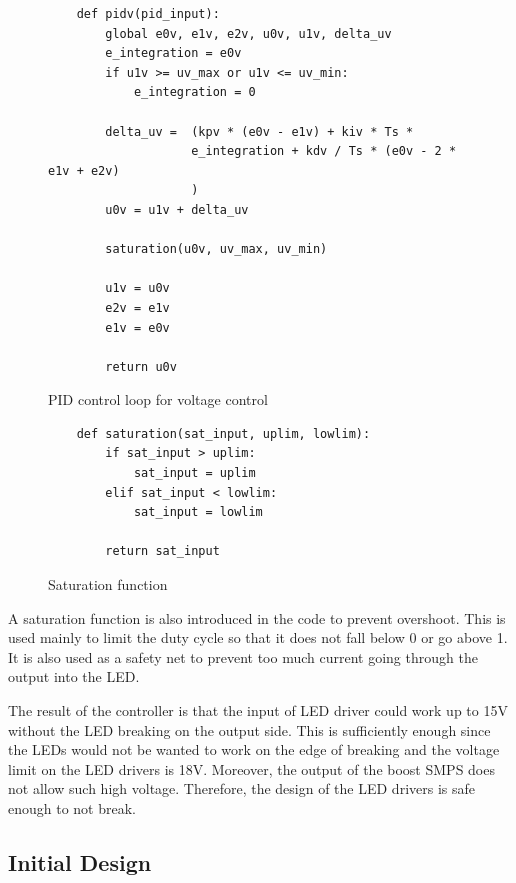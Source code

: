 \begin{figure}
    \footnotesize

    \begin{verbatim}
    def pidv(pid_input):
        global e0v, e1v, e2v, u0v, u1v, delta_uv
        e_integration = e0v
        if u1v >= uv_max or u1v <= uv_min:
            e_integration = 0

        delta_uv =  (kpv * (e0v - e1v) + kiv * Ts * 
                    e_integration + kdv / Ts * (e0v - 2 * e1v + e2v)
                    )  
        u0v = u1v + delta_uv

        saturation(u0v, uv_max, uv_min)

        u1v = u0v
        e2v = e1v
        e1v = e0v

        return u0v
    \end{verbatim}
    \caption{PID control loop for voltage control}
    \label{code:pidv}
\end{figure}

\begin{figure}
    \footnotesize
    \begin{verbatim}
    def saturation(sat_input, uplim, lowlim):
        if sat_input > uplim:
            sat_input = uplim
        elif sat_input < lowlim:
            sat_input = lowlim

        return sat_input
    \end{verbatim}
    \caption{Saturation function}
    \label{code:saturation}
\end{figure}

A saturation function is also introduced in the code to prevent overshoot. This is used mainly to limit the duty cycle so that it does not fall below 0 or go above 1. It is also used as a safety net to prevent too much current going through the output into the LED.

The result of the controller is that the input of LED driver could work up to 15V without the LED breaking on the output side. This is sufficiently enough since the LEDs would not be wanted to work on the edge of breaking and the voltage limit on the LED drivers is 18V. Moreover, the output of the boost SMPS does not allow such high voltage. Therefore, the design of the LED drivers is safe enough to not break.

\newpage

\subsection{Initial Design}

